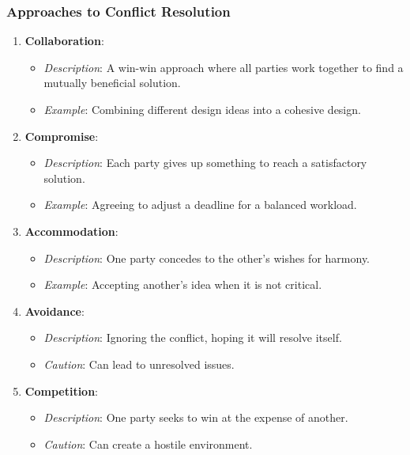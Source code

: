 \documentclass[aspectratio=169]{beamer}
\begin{document}
\begin{frame}[fragile]
    \frametitle{Approaches to Conflict Resolution}
    \begin{enumerate}
        \item \textbf{Collaboration}:
            \begin{itemize}
                \item \textit{Description}: A win-win approach where all parties work together to find a mutually beneficial solution.
                \item \textit{Example}: Combining different design ideas into a cohesive design.
            \end{itemize}
        
        \item \textbf{Compromise}:
            \begin{itemize}
                \item \textit{Description}: Each party gives up something to reach a satisfactory solution.
                \item \textit{Example}: Agreeing to adjust a deadline for a balanced workload.
            \end{itemize}
        
        \item \textbf{Accommodation}:
            \begin{itemize}
                \item \textit{Description}: One party concedes to the other’s wishes for harmony.
                \item \textit{Example}: Accepting another's idea when it is not critical.
            \end{itemize}
        
        \item \textbf{Avoidance}:
            \begin{itemize}
                \item \textit{Description}: Ignoring the conflict, hoping it will resolve itself.
                \item \textit{Caution}: Can lead to unresolved issues.
            \end{itemize}
        
        \item \textbf{Competition}:
            \begin{itemize}
                \item \textit{Description}: One party seeks to win at the expense of another.
                \item \textit{Caution}: Can create a hostile environment.
            \end{itemize}
    \end{enumerate}
\end{frame}
\end{document}
